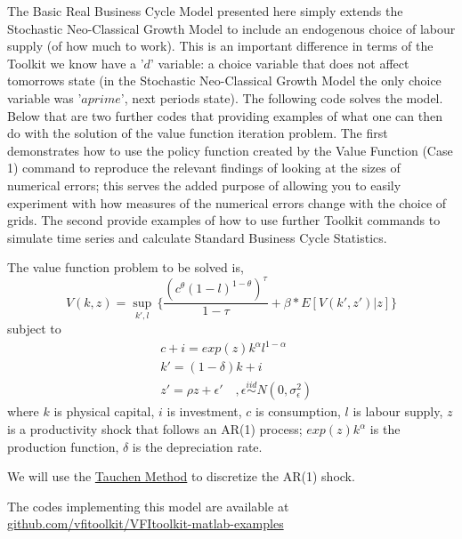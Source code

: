 %
 
The Basic Real Business Cycle Model presented here simply extends the Stochastic Neo-Classical Growth Model to include an endogenous
choice of labour supply (of how much to work). This is an important difference in terms of the Toolkit we know have a '$d$' variable:
a choice variable that does not affect tomorrows state (in the Stochastic Neo-Classical Growth Model the only choice variable
was '$aprime$', next periods state). The following code solves the model. Below that are two further codes that 
providing examples of what one can then do with the solution of the value function iteration problem. The first demonstrates how to 
use the policy function created by the Value Function (Case 1) command to reproduce the relevant findings
of \cite*{AruobaFernandezVillaverdeRubioRamirez2006} looking at the sizes of numerical errors; this serves the added purpose of 
allowing you to easily experiment with how measures of the numerical errors change with the choice of grids. The second provide examples of how to 
use further Toolkit commands to simulate time series and calculate Standard Business Cycle Statistics.

The value function problem to be solved is,
\begin{equation*}
 V(k,z)=\sup_{k',l} \, \{ \frac{(c^{\theta} (1-l)^{1-\theta})^{\tau}}{1-\tau}+\beta*E[V(k',z')|z] \}
\end{equation*}
subject to
\begin{eqnarray}
 & c+i=exp(z) k^{\alpha} l^{1-\alpha} \\
 & k'=(1-\delta)k+i \\
 & z'=\rho z +\epsilon' \quad ,\epsilon \overset{iid}{\sim} N(0,\sigma_{\epsilon}^2)
\end{eqnarray}
where $k$ is physical capital, $i$ is investment, $c$ is consumption, $l$ is labour supply, $z$ is a productivity shock that follows an AR(1) process; 
$exp(z) k^{\alpha}$ is the production function, $\delta$ is the depreciation rate.

We will use the \href{appendix:TauchenMethod}{Tauchen Method} to discretize the AR(1) shock.

The codes implementing this model are available at  \href{https://github.com/vfitoolkit/VFItoolkit-matlab-examples}{github.com/vfitoolkit/VFItoolkit-matlab-examples}

